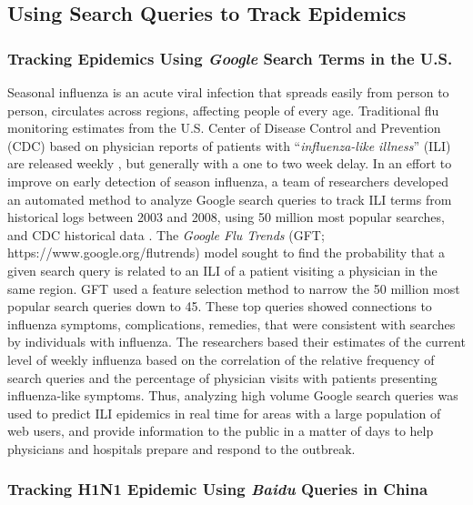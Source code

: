 \documentclass[sigconf]{acmart}
\begin{document}
\subsection{Using Search Queries to Track Epidemics}

\subsubsection{Tracking Epidemics Using {\itshape Google} Search Terms in the U.S.}

Seasonal influenza is an acute viral infection that spreads easily from person to 
person, circulates across regions, affecting people of every age. Traditional flu 
monitoring estimates from the U.S. Center of Disease Control and Prevention (CDC) 
based on physician reports of patients with ``{\it influenza-like illness}'' (ILI) are 
released weekly \cite{cdc17}, but generally with a one to two week delay. In an effort 
to improve on early detection of season influenza, a team of researchers developed an 
automated method to analyze Google search queries to track ILI terms from historical 
logs between 2003 and 2008, using 50 million most popular searches, and CDC historical 
data \cite{ginsburg09}. The {\it Google Flu Trends} (GFT; https://www.google.org/flutrends)
model sought to find the probability that a given search query is related to an ILI of a 
patient visiting a physician in the same region. GFT used a feature selection method to 
narrow  the 50 million most popular search queries down to 45. These top queries showed 
connections to influenza symptoms, complications, remedies, that were consistent with 
searches by individuals with influenza. The researchers based their estimates of the 
current level of weekly influenza based on the correlation of the relative frequency 
of search queries and the percentage of physician visits with patients presenting 
influenza-like symptoms. Thus, analyzing high volume Google search queries was used 
to predict ILI epidemics in real time for areas with a large population of web users, 
and provide information to the public in a matter of days to help physicians and 
hospitals prepare and respond to the outbreak. 

\subsubsection{Tracking H1N1 Epidemic Using {\itshape Baidu} Queries in China}
\end{document}
